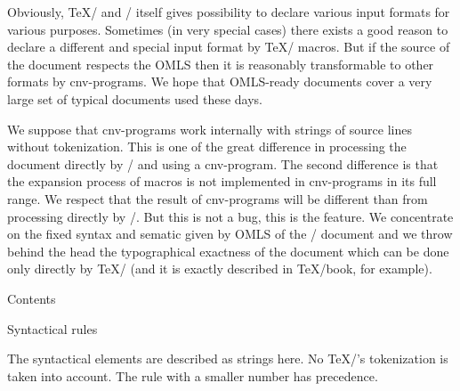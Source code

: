 Obviously, \TeX/ and \OpTeX/ itself gives possibility to declare various
input formats for various purposes. Sometimes (in very special cases) there
exists a good reason to declare a different and special input format by
\TeX/ macros. But if the source of the document respects the OMLS then it is
reasonably transformable to other formats by cnv-programs. We hope that
OMLS-ready documents cover a very large set of typical documents used these
days.

We suppose that cnv-programs work internally with strings of source lines
without tokenization. This is one of the great difference in processing the
document directly by \OpTeX/ and using a cnv-program. The second difference is
that the expansion process of macros is not implemented in cnv-programs in
its full range. We respect that the result of cnv-programs will be different
than from processing directly by \OpTeX/. But this is not a bug, this is
the feature. We concentrate on the fixed syntax and sematic given by OMLS of the
\OpTeX/ document and we throw behind the head the typographical
exactness of the document which can be done only directly by \TeX/ (and it is
exactly described in \TeX/book, for example).

\notoc\nonum\sec Contents

\maketoc
\vfil\break

\sec Syntactical rules

The syntactical elements are described as strings here. No \TeX/'s tokenization is
taken into account. The rule with a smaller number has precedence.

